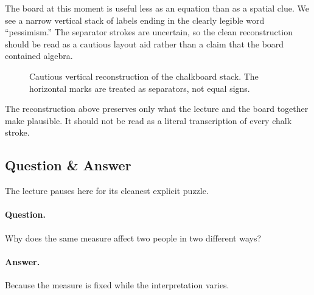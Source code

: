 The board at this moment is useful less as an equation than as a spatial clue. We see a narrow vertical stack of labels ending in the clearly legible word ``pessimism.'' The separator strokes are uncertain, so the clean reconstruction should be read as a cautious layout aid rather than a claim that the board contained algebra.

\begin{figure}[h]
\centering
{}
\caption{Cautious vertical reconstruction of the chalkboard stack. The horizontal marks are treated as separators, not equal signs.}
\end{figure}

\begin{remark}
The reconstruction above preserves only what the lecture and the board together make plausible. It should not be read as a literal transcription of every chalk stroke.
\end{remark}

\subsection{Question \& Answer}

The lecture pauses here for its cleanest explicit puzzle.

\paragraph{Question.} Why does the same measure affect two people in two different ways?

\paragraph{Answer.} Because the measure is fixed while the interpretation varies.

